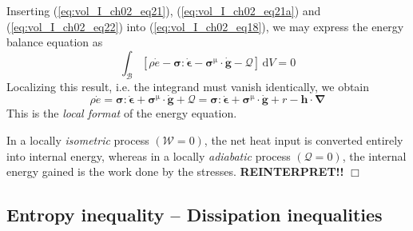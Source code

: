 Inserting (\ref{eq:vol_I_ch02_eq21}), (\ref{eq:vol_I_ch02_eq21a}) and (\ref{eq:vol_I_ch02_eq22})
into (\ref{eq:vol_I_ch02_eq18}), we may express the energy balance
equation as
\begin{equation}
  \int_{\mathcal B}\left[\rho\dot{e} - {\bm \sigma} : \dot{\bm \epsilon} - \bm{\sigma}^{\mathrm{\mu}} \cdot \dot{\bm g} - {\mathcal Q}\right]\,{\mathrm{d}}V = 0
   \label{eq:vol_I_ch02_eq24}
\end{equation}
Localizing this result, i.e. the integrand must vanish
identically, we obtain
\begin{equation}
  \rho \dot{e} =
  {\bm \sigma} : \dot{\bm \epsilon} + \bm{\sigma}^{\mathrm{\mu}} \cdot \dot{\bm g} + {\mathcal Q} =
  {\bm \sigma} : \dot{\bm \epsilon} + \bm{\sigma}^{\mathrm{\mu}} \cdot \dot{\bm g} + r - {\bm h}\cdot{\bm \nabla}
   \label{eq:vol_I_ch02_eq25}
\end{equation}
This is the {\em local format} of the energy equation.

\begin{remark} In a locally {\em isometric} process $({\mathcal W}=0)$,
the net heat input is converted entirely into internal energy,
whereas in a locally {\em adiabatic} process $({\mathcal Q}=0)$, the
internal energy gained is the work done by the stresses. \textbf{REINTERPRET!!} $\Box$
\end{remark}


\subsection{Entropy inequality -- Dissipation inequalities}


